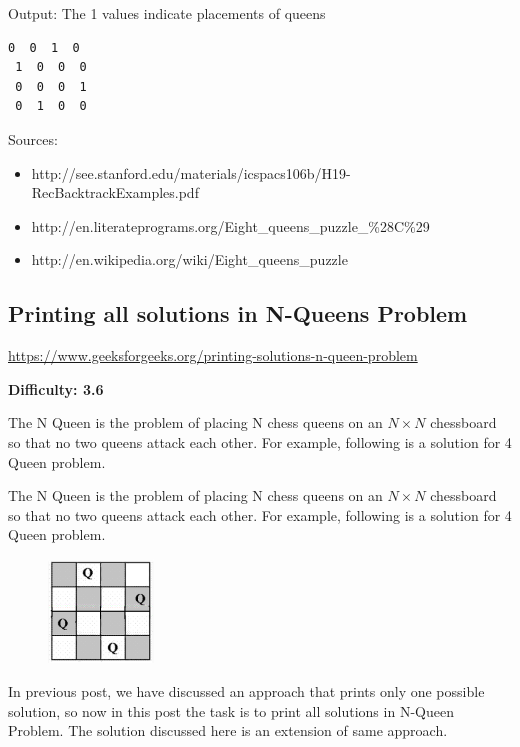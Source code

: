 Output: The 1 values indicate placements of queens
\begin{lstlisting}[style=rayio]
 0  0  1  0 
 1  0  0  0 
 0  0  0  1 
 0  1  0  0 
\end{lstlisting}

Sources:
\begin{itemize}[noitemsep,topsep=0pt]
\item
  http://see.stanford.edu/materials/icspacs106b/H19-RecBacktrackExamples.pdf
\item http://en.literateprograms.org/Eight\_queens\_puzzle\_\%28C\%29
\item http://en.wikipedia.org/wiki/Eight\_queens\_puzzle
\end{itemize}


\subsection{Printing all solutions in N-Queens Problem}

\url{https://www.geeksforgeeks.org/printing-solutions-n-queen-problem}

\textbf{Difficulty: 3.6}

The N Queen is the problem of placing N chess queens on an $N\times N$
chessboard so that no two queens attack each other. For example, following
is a solution for 4 Queen problem.

The N Queen is the problem of placing N chess queens on an $N\times N$
chessboard so that no two queens attack each other. For example, following
is a solution for 4 Queen problem.

\begin{figure}
\centering
\includegraphics[width=0.25\textwidth]{Images/figGFGBkTSet3NQueen}
\end{figure}

In previous post, we have discussed an approach that prints only one
possible solution, so now in this post the task is to print all solutions in
N-Queen Problem. The solution discussed here is an extension of same
approach.

